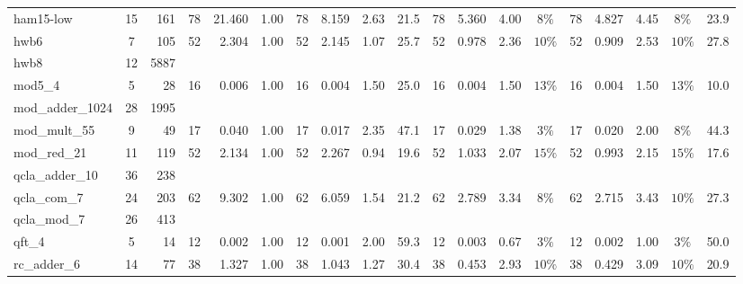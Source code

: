 \begin{table}[H]
\begin{tabular}{l c r | r r r | r r r r | r r r c | r r r c r}
ham15-low & 15 & 161 & \cellcolor{bestT}78 & 21.460 & 1.00 & \cellcolor{bestT}78 & 8.159 & 2.63 & 21.5 & \cellcolor{bestT}78 & 5.360 & 4.00 & $8\%$ & \cellcolor{bestT}78 & 4.827 & \cellcolor{bestTime}4.45 & $8\%$ & 23.9 \\
hwb6 & 7 & 105 & \cellcolor{bestT}52 & 2.304 & 1.00 & \cellcolor{bestT}52 & 2.145 & 1.07 & 25.7 & \cellcolor{bestT}52 & 0.978 & 2.36 & $10\%$ & \cellcolor{bestT}52 & 0.909 & \cellcolor{bestTime}2.53 & $10\%$ & 27.8 \\
hwb8 & 12 & 5887 &  &  &  &  &  &  &  &  &  &  &  &  &  &  &  &  \\
mod5\_4 & 5 & 28 & \cellcolor{bestT}16 & 0.006 & 1.00 & \cellcolor{bestT}16 & 0.004 & \cellcolor{bestTime}1.50 & 25.0 & \cellcolor{bestT}16 & 0.004 & \cellcolor{bestTime}1.50 & $13\%$ & \cellcolor{bestT}16 & 0.004 & \cellcolor{bestTime}1.50 & $13\%$ & 10.0 \\
mod\_adder\_1024 & 28 & 1995 &  &  &  &  &  &  &  &  &  &  &  &  &  &  &  &  \\
mod\_mult\_55 & 9 & 49 & \cellcolor{bestT}17 & 0.040 & 1.00 & \cellcolor{bestT}17 & 0.017 & \cellcolor{bestTime}2.35 & 47.1 & \cellcolor{bestT}17 & 0.029 & 1.38 & $3\%$ & \cellcolor{bestT}17 & 0.020 & 2.00 & $8\%$ & 44.3 \\
mod\_red\_21 & 11 & 119 & \cellcolor{bestT}52 & 2.134 & 1.00 & \cellcolor{bestT}52 & 2.267 & 0.94 & 19.6 & \cellcolor{bestT}52 & 1.033 & 2.07 & $15\%$ & \cellcolor{bestT}52 & 0.993 & \cellcolor{bestTime}2.15 & $15\%$ & 17.6 \\
qcla\_adder\_10 & 36 & 238 &  &  &  &  &  &  &  &  &  &  &  &  &  &  &  &  \\
qcla\_com\_7 & 24 & 203 & \cellcolor{bestT}62 & 9.302 & 1.00 & \cellcolor{bestT}62 & 6.059 & 1.54 & 21.2 & \cellcolor{bestT}62 & 2.789 & 3.34 & $8\%$ & \cellcolor{bestT}62 & 2.715 & \cellcolor{bestTime}3.43 & $10\%$ & 27.3 \\
qcla\_mod\_7 & 26 & 413 &  &  &  &  &  &  &  &  &  &  &  &  &  &  &  &  \\
qft\_4 & 5 & 14 & \cellcolor{bestT}12 & 0.002 & 1.00 & \cellcolor{bestT}12 & 0.001 & \cellcolor{bestTime}2.00 & 59.3 & \cellcolor{bestT}12 & 0.003 & 0.67 & $3\%$ & \cellcolor{bestT}12 & 0.002 & 1.00 & $3\%$ & 50.0 \\
rc\_adder\_6 & 14 & 77 & \cellcolor{bestT}38 & 1.327 & 1.00 & \cellcolor{bestT}38 & 1.043 & 1.27 & 30.4 & \cellcolor{bestT}38 & 0.453 & 2.93 & $10\%$ & \cellcolor{bestT}38 & 0.429 & \cellcolor{bestTime}3.09 & $10\%$ & 20.9 \\

\end{tabular}
\end{table}
